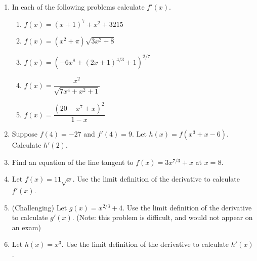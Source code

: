 \documentclass[reqno,psamsfonts]{amsart}
\theoremstyle{definition}
\theoremstyle{remark}
\numberwithin{equation}{section}
\begin{document}
\begin{enumerate}
\vspace{1em}
\item In each of the following problems calculate $f'(x)$.
\vspace{1em}
\begin{enumerate}
\item $f(x) = (x+1)^7+x^2+3215$
\vspace{3em}
\item $f(x) = (x^2+\pi)\sqrt{3x^2+8}$
\vspace{3em}
\item $f(x) = (-6x^8+(2x+1)^{4/3}+1)^{2/7}$
\vspace{3em}
\item $f(x) = \dfrac{x^2}{\sqrt{7x^4+x^2+1}}$
\vspace{3em}
\item $f(x) = \dfrac{(20-x^7+x)^2}{1-x}$
\vspace{3em}
\end{enumerate}

\item Suppose $f(4)=-27$ and $f'(4)=9$. Let $h(x) = f(x^3+x-6)$. Calculate $h'(2)$.
\vspace{3em}
\item Find an equation of the line tangent to $f(x) =3x^{7/3}+x$ at $x=8$.
\vspace{3em}
\item Let $f(x) = 11\sqrt{x}$. Use the limit definition of the derivative to calculate $f'(x)$.
\vspace{3em}
\item (Challenging) Let $g(x) = x^{2/3}+4$. Use the limit definition of the derivative to calculate $g'(x)$.  (Note: this problem is difficult, and would not appear on an exam)
\vspace{3em}
\item Let $h(x) = x^{3}$. Use the limit definition of the derivative to calculate $h'(x)$.
\end{enumerate}
\end{document}
